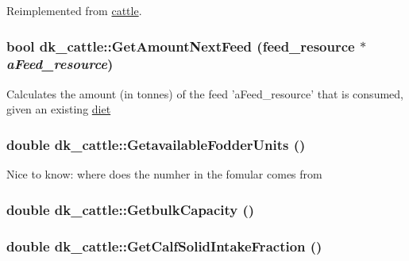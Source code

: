Reimplemented from \hyperlink{classcattle_a5b3d8710accc9b14ac6881ed758fe4ae}{cattle}.\hypertarget{classdk__cattle_a583f0e54f2b9c689cf2dc9935226e696}{
\subsubsection[{GetAmountNextFeed}]{\setlength{\rightskip}{0pt plus 5cm}bool dk\_\-cattle::GetAmountNextFeed ({\bf feed\_\-resource} $\ast$ {\em aFeed\_\-resource})}}
\label{classdk__cattle_a583f0e54f2b9c689cf2dc9935226e696}
Calculates the amount (in tonnes) of the feed 'aFeed\_\-resource' that is consumed, given an existing \hyperlink{classdiet}{diet} \hypertarget{classdk__cattle_a01c48455806f5540445eb6f0cba46955}{
\subsubsection[{GetavailableFodderUnits}]{\setlength{\rightskip}{0pt plus 5cm}double dk\_\-cattle::GetavailableFodderUnits ()}}
\label{classdk__cattle_a01c48455806f5540445eb6f0cba46955}
Nice to know: where does the numher in the fomular comes from \hypertarget{classdk__cattle_a706687977fea1dc291900edcb681917d}{
\subsubsection[{GetbulkCapacity}]{\setlength{\rightskip}{0pt plus 5cm}double dk\_\-cattle::GetbulkCapacity ()}}
\label{classdk__cattle_a706687977fea1dc291900edcb681917d}
\hypertarget{classdk__cattle_a419381e2c60d8fafc3d1ba70a73994e7}{
\subsubsection[{GetCalfSolidIntakeFraction}]{\setlength{\rightskip}{0pt plus 5cm}double dk\_\-cattle::GetCalfSolidIntakeFraction ()}}
